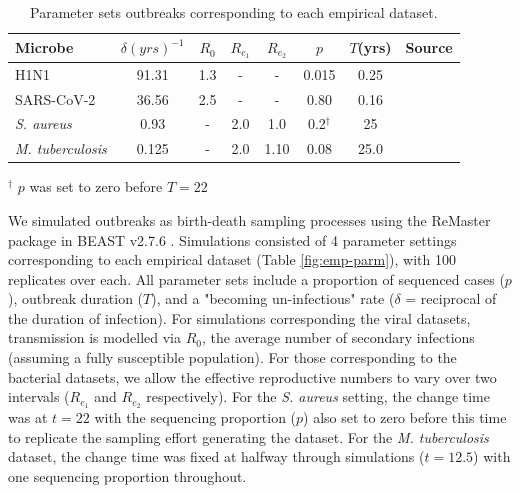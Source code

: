 \documentclass{article}
\begin{document}
\begin{spacing}{1.5}
\begin{table}[h!]
    \centering
    \caption{Parameter sets outbreaks corresponding to each empirical dataset.}
    \begin{tabular}{l|c|c|c|c|c|c|l|}
    \hline
    Microbe                     &   $\delta (yrs)^{-1}$    & $R_0$ &   $R_{e_1}$   &  $R_{e_2}$    &   $p$   &   $T$(yrs)   & Source \\
    \hline
    H1N1                        &   91.31    & 1.3 &   -   &  -    &   0.015   &   0.25 & \citet{hedge_2013_real-time} \\
    SARS-CoV-2                  &   36.56    & 2.5 &   -   &  -   &   0.80   &  0.16 & \citet{lane2021genomics} \\
    \textit{S. aureus}    &   0.93    &  - &   2.0   &  1.0   &   0.2$^{\dagger}$   &   25 & \citet{duchene_2016_genome} \\
    \textit{M. tuberculosis}    &   0.125    &  - &   2.0   &  1.10    &   0.08   &   25.0 & \citet{kuhnert_tuberculosis_2018} \\
    \hline
    \end{tabular}
    \label{tab:sim_parms}
\end{table}
\footnotesize{$^\dagger$ $p$ was set to zero before $T=22$}

We simulated outbreaks as birth-death sampling processes using the ReMaster package in BEAST v2.7.6 \citep{vaughan_remaster_2024,bouckaert_beast_2019}. Simulations consisted of 4 parameter settings corresponding to each empirical dataset (Table \ref{fig:emp-parm}), with 100 replicates over each. All parameter sets include a proportion of sequenced cases ($p$), outbreak duration ($T$), and a "becoming un-infectious" rate ($\delta$ = reciprocal of the duration of infection). For simulations corresponding the viral datasets, transmission is modelled via $R_0$, the average number of secondary infections (assuming a fully susceptible population). For those corresponding to the bacterial datasets, we allow the effective reproductive numbers to vary over two intervals ($R_{e_1}$ and $R_{e_2}$ respectively). For the \textit{S. aureus} setting, the change time was at $t=22$ with the sequencing proportion ($p$) also set to zero before this time to replicate the sampling effort generating the dataset. For the \textit{M. tuberculosis} dataset, the change time was fixed at halfway through simulations ($t=12.5$) with one sequencing proportion throughout.


\end{spacing}
\end{document}
